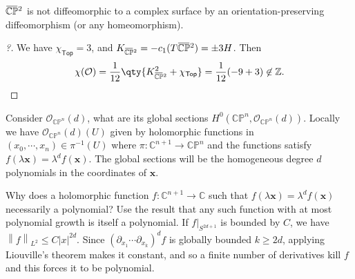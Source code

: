 \begin{proposition}[?]

\(\mkern 1.5mu\overline{\mkern-1.5mu{\mathbb{CP}}\mkern-1.5mu}\mkern 1.5mu^2\)
is not diffeomorphic to a complex surface by an orientation-preserving
diffeomorphism (or any homeomorphism).

\end{proposition}

\begin{proof}[?]

We have \(\chi_{\mathsf{Top}}= 3\), and
\(K_{\mkern 1.5mu\overline{\mkern-1.5mu{\mathbb{CP}}\mkern-1.5mu}\mkern 1.5mu^2} = -c_1(T \mkern 1.5mu\overline{\mkern-1.5mu{\mathbb{CP}}\mkern-1.5mu}\mkern 1.5mu^2) = \pm 3H\).
Then
\begin{align*}
\chi({\mathcal{O}}) = {1\over 12}\qty{ K_{\mkern 1.5mu\overline{\mkern-1.5mu{\mathbb{CP}}\mkern-1.5mu}\mkern 1.5mu^2}^2 + \chi_{\mathsf{Top}}} = {1\over 12}(-9+3) \not\in {\mathbb{Z}}
.\end{align*}

\end{proof}

\begin{remark}

Consider \({\mathcal{O}}_{{\mathbb{CP}}^n}(d)\), what are its global
sections \(H^0({\mathbb{CP}}^n, {\mathcal{O}}_{{\mathbb{CP}}^n}(d))\).
Locally we have \({\mathcal{O}}_{{\mathbb{CP}}^n}(d)(U)\) given by
holomorphic functions in \((x_0, \cdots, x_n) \in \pi^{-1}(U)\) where
\(\pi: {\mathbb{C}}^{n+1} \to {\mathbb{CP}}^n\) and the functions
satisfy \(f(\lambda \mathbf{x}) = \lambda^d f(\mathbf{x})\). The global
sections will be the homogeneous degree \(d\) polynomials in the
coordinates of \(\mathbf{x}\).

\end{remark}

\begin{remark}

Why does a holomorphic function
\(f: {\mathbb{C}}^{n+1} \to {\mathbb{C}}\) such that
\(f(\lambda \mathbf{x}) = \lambda^d f(\mathbf{x})\) necessarily a
polynomial? Use the result that any such function with at most
polynomial growth is itself a polynomial. If
\({ \left.{{f}} \right|_{{S^{2d+1}}} }\) is bounded by \(C\), we have
\({\left\lVert {f} \right\rVert}_{L^2} \leq C {\left\lvert {x} \right\rvert}^{2d}\).
Since \(({{\partial}}_{x_1} \cdots {{\partial}}_{x_k})^d f\) is globally
bounded \(k\geq 2d\), applying Liouville's theorem makes it constant,
and so a finite number of derivatives kill \(f\) and this forces it to
be polynomial.

\end{remark}


